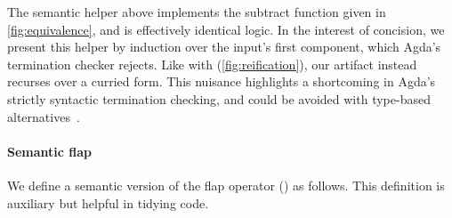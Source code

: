 \documentclass[sigplan,screen]{acmart}
\begin{document}
The semantic helper above implements the subtract function given in \cref{fig:equivalence}, and is effectively identical logic. In the interest of concision, we present this helper by induction over the  input's first component, which Agda's termination checker rejects. Like with  (\cref{fig:reification}), our artifact instead recurses over a curried form. This nuisance highlights a shortcoming in Agda's strictly syntactic termination checking, and could be avoided with type-based alternatives~\citep{AbelP16, AbreuDHJMS23}.

\paragraph{Semantic flap}
We define a semantic version of the flap operator () as follows. This definition is auxiliary but helpful in tidying code.
\end{document}
